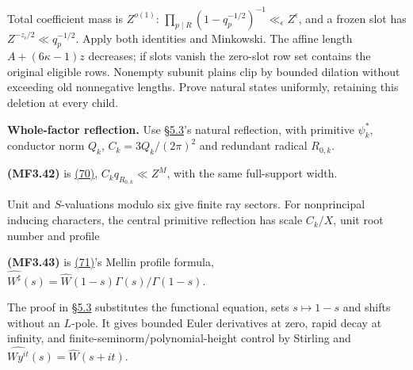 \hypertarget{mf:eq:B3.41}{}

\label{mf:eq:B3.41}

\par\noindent\resizebox{\linewidth}{!}{\begin{minipage}{\dimexpr\linewidth+61.43738pt\relax}\[
S_{k,R}(X)=\sum_{d\mid R}\frac{\mu(d)\psi_k^0(d)}{\sqrt{q_d}}
 S_k^0(X/q_d),\qquad
Q_{k,i,R}=Q_{k,i}^0-Z^{-z_i/2}\sum_{p\mid R}\psi_k^0(p)\nu_i(p)W(q_p/Z^{z_i})(q_p/Z^{z_i})^{-\sigma_i+iv_i}.
\qquad\text{(MF3.41)}
\]\end{minipage}}\par

Total coefficient mass is \(Z^{o(1)}\): \(\prod_{p\mid R}(1-q_p^{-1/2})^{-1}\ll_\epsilon Z^\epsilon\), and a frozen slot has \(Z^{-z_i/2}\ll q_p^{-1/2}\). Apply both identities and Minkowski. The affine length \(A+(6\kappa-1)z\) decreases; if slots vanish the zero-slot row set contains the original eligible rows. Nonempty subunit plains clip by bounded dilation without exceeding old nonnegative lengths. Prove natural states uniformly, retaining this deletion at every child.

\textbf{Whole-factor reflection.} Use §\protect\hyperlink{cf:sec:D.3}{5.3}'s natural reflection, with primitive \(\psi_k^*\), conductor norm \(Q_k\), \(C_k=3Q_k/(2\pi)^2\) and redundant radical \(R_{0,k}\).

\hypertarget{mf:eq:B3.42}{}

\label{mf:eq:B3.42}

\textbf{(MF3.42)} is \protect\hyperlink{cf:eq:D.6}{(70)}, \(C_kq_{R_{0,k}}\ll Z^M\), with the same full-support width.

Unit and \(S\)-valuations modulo six give finite ray sectors. For nonprincipal inducing characters, the central primitive reflection has scale \(C_k/X\), unit root number and profile

\hypertarget{mf:eq:B3.43}{}

\label{mf:eq:B3.43}

\textbf{(MF3.43)} is \protect\hyperlink{cf:eq:D.7}{(71)}'s Mellin profile formula, \(\widehat{W^\sharp}(s)=\widehat W(1-s)\Gamma(s)/\Gamma(1-s)\).

The proof in §\protect\hyperlink{cf:sec:D.3}{5.3} substitutes the functional equation, sets \(s\mapsto1-s\) and shifts without an \(L\)-pole. It gives bounded Euler derivatives at zero, rapid decay at infinity, and finite-seminorm/polynomial-height control by Stirling and \(\widehat{Wy^{it}}(s)=\widehat W(s+it)\).

